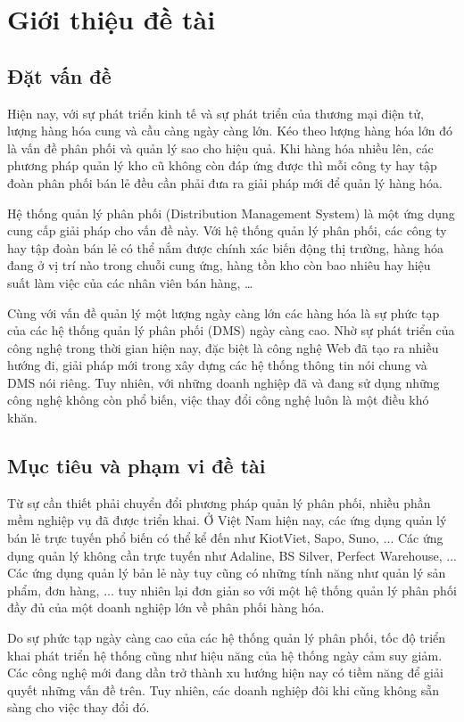 \chapter{Giới thiệu đề tài}

\section{Đặt vấn đề}
Hiện nay, với sự phát triển kinh tế và sự phát triển của thương mại
điện tử, lượng hàng hóa cung và cầu càng ngày càng lớn. Kéo theo lượng
hàng hóa lớn đó là vấn đề phân phối và quản lý sao cho hiệu quả. Khi hàng
hóa nhiều lên, các phương pháp quản lý kho cũ không còn đáp ứng được
thì mỗi công ty hay tập đoàn phân phối bán lẻ đều cần phải đưa ra giải pháp
mới để quản lý hàng hóa.

Hệ thống quản lý phân phối (Distribution Management System) là một ứng dụng
cung cấp giải pháp cho vấn đề này. Với hệ thống quản lý phân phối,
các công ty hay tập đoàn bán lẻ có thể nắm
được chính xác biến động thị trường,
hàng hóa đang ở vị trí nào trong chuỗi cung ứng, hàng tồn kho còn bao
nhiêu hay hiệu suất làm việc của các nhân viên bán hàng, …

Cùng với vấn đề quản lý một lượng ngày càng lớn các hàng hóa là sự phức
tạp của các hệ thống quản lý phân phối (DMS) ngày càng cao. Nhờ sự
phát triển của công nghệ trong thời gian hiện nay, đặc biệt là công nghệ
Web đã tạo ra nhiều hướng đi, giải pháp mới trong xây dựng các hệ thống
thông tin nói chung và DMS nói riêng. Tuy nhiên, với những doanh nghiệp
đã và đang sử dụng những công nghệ không còn phổ biến, việc thay đổi
công nghệ luôn là một điều khó khăn.

\section{Mục tiêu và phạm vi đề tài}
Từ sự cần thiết phải chuyển đổi phương pháp quản lý phân phối, nhiều phần
mềm nghiệp vụ đã được triển khai. Ở Việt Nam hiện nay, các ứng dụng
quản lý bán lẻ trực tuyến phổ biến có thể kể đến như KiotViet, Sapo, Suno,
... Các ứng dụng quản lý không cần trực tuyến như Adaline, BS Silver,
Perfect Warehouse, ... Các ứng dụng quản lý bản lẻ này tuy cũng có
những tính năng như quản lý sản phẩm, đơn hàng, ... tuy nhiên lại đơn giản
so với một hệ thống quản lý phân phối đầy đủ của một doanh nghiệp lớn về
phân phối hàng hóa.

Do sự phức tạp ngày càng cao của các hệ thống quản lý phân phối, tốc độ
triển khai phát triển hệ thống cũng như hiệu năng của hệ thống ngày cảm
suy giảm. Các công nghệ mới đang dần trở thành xu hướng hiện nay có tiềm
năng để giải quyết những vấn đề trên. Tuy nhiên, các doanh nghiệp đôi
khi cũng không sẵn sàng cho việc thay đổi đó.

